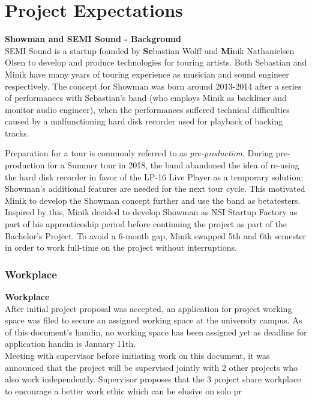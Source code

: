 \chapter{Project Expectations}
\textbf{Showman and SEMI Sound - Background} \\
SEMI Sound is a startup founded by \textbf{Se}bastian Wolff and \textbf{Mi}nik Nathanielsen Olsen to develop and produce technologies for touring artists. Both Sebastian and Minik have many years of touring experience  as musician and sound engineer respectively. The concept for Showman was born around 2013-2014 after a series of performances with Sebastian's band (who employs Minik as backliner and monitor audio engineer), when the performances suffered technical difficulties caused by a malfunctioning hard disk recorder used for playback of backing tracks. \newline

Preparation for a tour is commonly referred to as \textit{pre-production}. During pre-production for a Summer tour in 2018, the band abandoned the idea of re-using the hard disk recorder in favor of the LP-16 Live Player as a temporary solution; Showman's additional features are needed for the next tour cycle. This motivated Minik to develop the Showman concept further and use the band as betatesters. Inspired by this, Minik decided to develop Showman as NSI Startup Factory as part of his apprenticeship period before continuing the project as part of the Bachelor's Project. To avoid a 6-month gap, Minik swapped 5th and 6th semester in order to work full-time on the project without interruptions. \newline

\subsection{Workplace}
\textbf{Workplace} \\
After initial project proposal was accepted, an application for project working space was filed to secure an assigned working space at the university campus. As of this document's handin, no working space has been assigned yet as deadline for application handin is January 11th. \\

Meeting with supervisor before initiating work on this document, it was announced that the project will be supervised jointly with 2 other projects who also work independently. Supervisor proposes that the 3 project share workplace to encourage a better work ethic which can be elusive on solo pr

